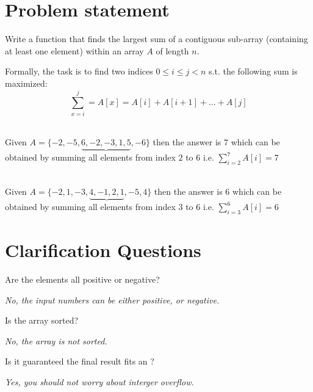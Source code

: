 \section{Problem statement}
\begin{exercise}
Write a function that finds the largest sum of a contiguous sub-array (containing at least one element) within an array $A$
of length $n$.

Formally, the task is to find two indices $ 0 \leq i \leq j < n$ s.t. the following sum is maximized:
\[
\sum_{x=i}^j   = A[x] = A[i] + A[i+1] + \ldots + A[j] 
\]

	\begin{example}
		\hfill \\
		Given $A=\{-2, -5, \underbrace{6, -2, -3, 1, 5}\text{}, -6\}$ then the answer is $7$ which can
		be obtained by summing all elements from index $2$ to $6$ i.e. $\sum_{i=2}^7 A[i] = 7$
	\end{example}

	\begin{example}
		\hfill \\
		Given $A=\{-2, 1, -3, \underbrace{4, -1, 2, 1}\text{}, -5, 4\}$ then the answer is $6$ which can
		be obtained by summing all elements from index $3$ to $6$ i.e. $\sum_{i=3}^6 A[i] = 6$
		
	\end{example}
\end{exercise}

\section{Clarification Questions}

\begin{QandA}
	\begin{questionitem} \begin{question} Are the elements all positive or negative?  \end{question} 	 
    \begin{answered}
		\textit{No, the input numbers can be either positive, or negative.}
	\end{answered} \end{questionitem}
	
	\begin{questionitem} \begin{question} Is the array sorted?  \end{question} 	 
    \begin{answered}
		\textit{No, the array is not sorted.}
	\end{answered} \end{questionitem}

	\begin{questionitem} \begin{question} Is it guaranteed the final result fits an ?  \end{question} 	 
    \begin{answered}
		\textit{Yes, you should not worry about interger overflow.}
	\end{answered} \end{questionitem}
	
\end{QandA}

